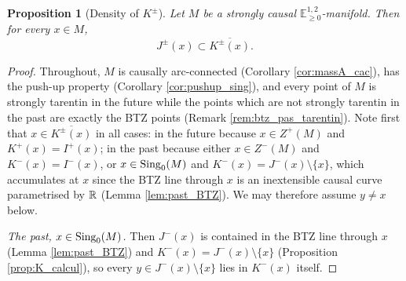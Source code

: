 \documentclass[a4paper,twoside]{article}
\newcommand{\mass}[1]{\mathbb{E}^{1,2}_{#1}}
\newtheorem{prop}[lem]{Proposition}
\begin{document}
\begin{prop}[Density of $K^\pm$]\label{prop:K_densite_sing}
Let $M$ be a strongly causal $\mass{\geq0}$-manifold. Then for every $x\in M$,
$$J^\pm(x)\subset \overline{K^\pm(x)}.$$
\end{prop}
\begin{proof}
Throughout, $M$ is causally arc-connected (Corollary \ref{cor:massA_cac}), has the push-up property
(Corollary \ref{cor:pushup_sing}), and every point of $M$ is strongly tarentin in the future while
the points which are not strongly tarentin in the past are exactly the BTZ points (Remark
\ref{rem:btz_pas_tarentin}). Note first that $x\in \overline{K^\pm(x)}$ in all cases: in the future
because $x\in Z^+(M)$ and $K^+(x)=I^+(x)$; in the past because either $x\in Z^-(M)$ and
$K^-(x)=I^-(x)$, or $x\in \mathrm{Sing}_0(M)$ and $K^-(x)=J^-(x)\setminus\{x\}$, which accumulates at $x$
since the BTZ line through $x$ is an inextensible causal curve parametrised by $\mathbb R$ (Lemma
\ref{lem:past_BTZ}). We may therefore assume $y\neq x$ below.

\emph{The past, $x\in \mathrm{Sing}_0(M)$.} Then $J^-(x)$ is contained in the BTZ line through $x$ (Lemma
\ref{lem:past_BTZ}) and $K^-(x)=J^-(x)\setminus\{x\}$ (Proposition \ref{prop:K_calcul}), so every
$y\in J^-(x)\setminus\{x\}$ lies in $K^-(x)$ itself.


\end{proof}
\end{document}
